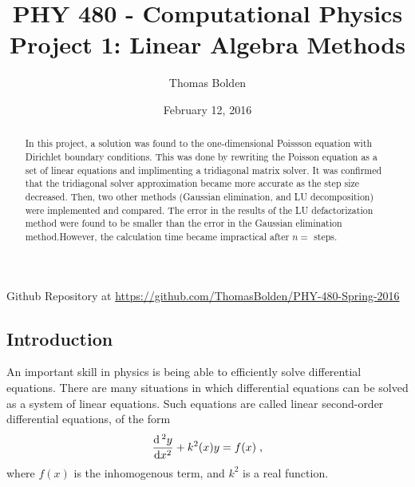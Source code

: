 \documentclass[11pt]{article}
\title{PHY 480 - Computational Physics \\ Project 1: Linear Algebra Methods}
\author{Thomas Bolden}
\date{February 12, 2016}
\begin{document}
\maketitle

\thispagestyle{empty}

\centerline{Github Repository at \href{https://github.com/ThomasBolden/PHY-480-Spring-2016}{https://github.com/ThomasBolden/PHY-480-Spring-2016}}

\begin{abstract}

    In this project, a solution was found to the one-dimensional Poissson equation with Dirichlet boundary conditions. This was done by rewriting the Poisson equation as a set of linear equations and implimenting a tridiagonal matrix solver. It was confirmed that the tridiagonal solver approximation became more accurate as the step size decreased. Then, two other methods (Gaussian elimination, and LU decomposition) were implemented and compared. The error in the results of the LU defactorization method were found to be smaller than the error in the Gaussian elimination method.However, the calculation time became impractical after $n=$ steps.

\end{abstract}

\vspace{\fill}
\tableofcontents

 \vspace{2cm}

\pagebreak

\setcounter{page}{1}

\subsection{Introduction}

    An important skill in physics is being able to efficiently solve differential equations. There are many situations in which differential equations can be solved as a system of linear equations. Such equations are called linear second-order differential equations, of the form
    \begin{equation} \dfrac{\dif\,^2 y}{\dif x^2} + k^2(x) y = f(x) \; , \end{equation}
    where $f(x)$ is the inhomogenous term, and $k^2$ is a real function. \\
\end{document}
